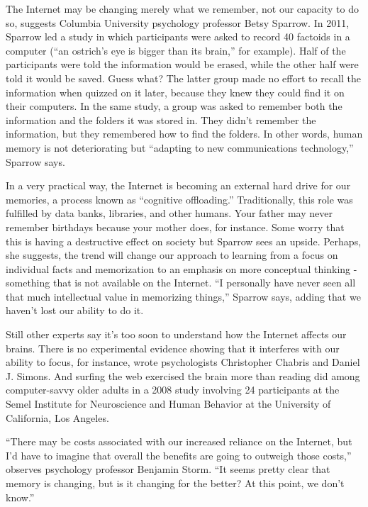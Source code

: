 The Internet may be changing merely what we remember, not our capacity to do so, suggests Columbia University psychology professor Betsy Sparrow. In 2011, Sparrow led a study in which participants were asked to record 40 factoids in a computer (``an ostrich's eye is bigger than its brain,'' for example). Half of the participants were told the information would be erased, while the other half were told it would be saved. Guess what? The latter group made no effort to recall the information when quizzed on it later, because they knew they could find it on their computers. In the same study, a group was asked to remember both the information and the folders it was stored in. They didn't remember the information, but they remembered how to find the folders. In other words, human memory is not deteriorating but ``adapting to new communications technology,'' Sparrow says.


In a very practical way, the Internet is becoming an external hard drive for our memories, a process known as ``cognitive offloading.'' Traditionally, this role was fulfilled by data banks, libraries, and other humans. Your father may never remember birthdays because your mother does, for instance. Some worry that this is having a destructive effect on society but Sparrow sees an upside. Perhaps, she suggests, the trend will change our approach to learning from a focus on individual facts and memorization to an emphasis on more conceptual thinking - something that is not available on the Internet. ``I personally have never seen all that much intellectual value in memorizing things,'' Sparrow says, adding that we haven't lost our ability to do it.


Still other experts say it's too soon to understand how the Internet affects our brains. There is no experimental evidence showing that it interferes with our ability to focus, for instance, wrote psychologists Christopher Chabris and Daniel J. Simons. And surfing the web exercised the brain more than reading did among computer-savvy older adults in a 2008 study involving 24 participants at the Semel Institute for Neuroscience and Human Behavior at the University of California, Los Angeles.


``There may be costs associated with our increased reliance on the Internet, but I'd have to imagine that overall the benefits are going to outweigh those costs,'' observes psychology professor Benjamin Storm. ``It seems pretty clear that memory is changing, but is it changing for the better? At this point, we don't know.''
